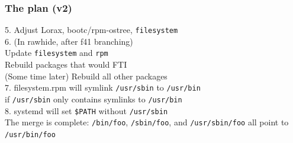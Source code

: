\documentclass[]{beamer}
\newcommand\pp{}
\begin{document}
\begin{frame}[fragile]
  \frametitle{The plan (v2)}

  \pp
  5. Adjust Lorax, bootc/rpm-ostree, \texttt{filesystem}
  \\\pp

  6. (In rawhide, after f41 branching)\\
  Update \texttt{filesystem} and \texttt{rpm}\\
  Rebuild packages that would FTI\\
  (Some time later) Rebuild all other packages
  \\\pp

  7. filesystem.rpm will symlink \texttt{/usr/sbin} to \texttt{/usr/bin}\\
  if \texttt{/usr/sbin} only contains symlinks to \texttt{/usr/bin}
  \\\pp

  8. systemd will set \texttt{\$PATH} without \texttt{/usr/sbin}
  \\\pp

  The merge is complete: \texttt{/bin/foo}, \texttt{/sbin/foo}, and
  \texttt{/usr/sbin/foo} all point to \texttt{/usr/bin/foo}
\end{frame}
\end{document}
